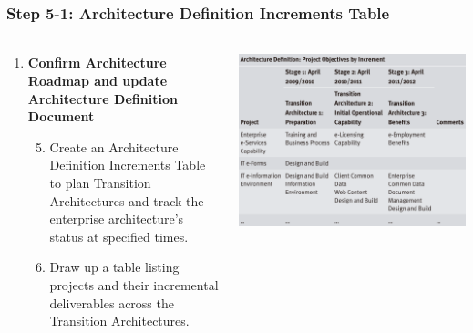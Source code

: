 \documentclass[aspectratio=169, table]{beamer}
\begin{document}
\begin{frame}
	\frametitle{Step 5-1: Architecture Definition Increments Table}
	\framesubtitle{\hspace{1cm}}
\vspace{25pt}
\begin{columns}[onlytextwidth]
	\begin{column}{0.45\textwidth}
		\begin{enumerate}
			\item \textbf{Confirm Architecture Roadmap and update Architecture Definition Document}
			\begin{enumerate}
				\setcounter{enumi}{4}
				\item Create an Architecture Definition Increments Table to plan Transition Architectures and track the enterprise architecture's status at specified times.
				\item Draw up a table listing projects and their incremental deliverables across the Transition Architectures.
			\end{enumerate}
		\end{enumerate}
	\end{column}
	\begin{column}{0.55\textwidth}
		\includegraphics[width=\textwidth]{../figures/architecture_definition_increments.png}
	\end{column}
\end{columns}

\end{frame}
\end{document}
